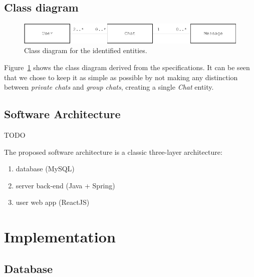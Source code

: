 \documentclass[10pt]{article}
\begin{document}
\subsection{Class diagram}
\begin{figure}[h!]
    \centering
    \includegraphics[width=\textwidth]{figs/class_diagram}
    \caption{Class diagram for the identified entities.}
    \label{fig:class_diagram}
\end{figure}

Figure~\ref{fig:class_diagram} shows the class diagram derived from the specifications. 
It can be seen that we chose to keep it as simple as possible by not making  
any distinction between \emph{private chats} and \emph{group chats}, 
creating a single \emph{Chat} entity.

\subsection{Software Architecture}
TODO

The proposed software architecture is a classic three-layer architecture:
\begin{enumerate}
    \item database (MySQL)
    \item server back-end (Java + Spring)
    \item user web app (ReactJS)
\end{enumerate}

\clearpage
\section{Implementation}

\subsection{Database}
\end{document}
